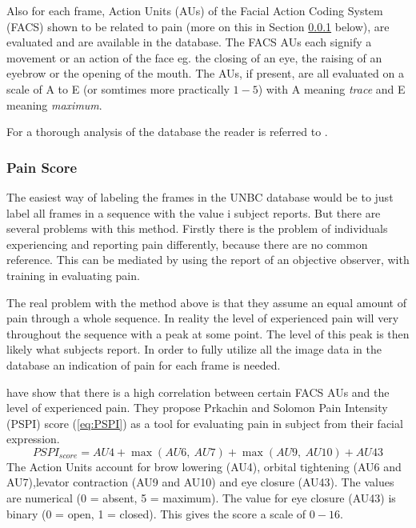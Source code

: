 \documentclass[Main]{subfiles}
\begin{document}
		Also for each frame, Action Units (AUs) of the Facial Action Coding System (FACS) \cite{Ekman1978} shown to be related to pain (more on this in Section \ref{ssub:pain_score} below), are evaluated and are available in the database. 
		The FACS AUs each signify a movement or an action of the face eg. the closing of an eye, the raising of an eyebrow or the opening of the mouth.
		The AUs, if present, are all evaluated on a scale of A to E (or somtimes more practically $1-5$) with A meaning \emph{trace} and E meaning \emph{maximum}.

		For a thorough analysis of the database the reader is referred to \cite{Lucey2012}.
		
		\subsubsection{Pain Score} %
			\label{ssub:pain_score}
			The easiest way of labeling the frames in the UNBC database would be to just label all frames in a sequence with the value i subject reports.
			But there are several problems with this method.
			Firstly there is the problem of individuals experiencing and reporting pain differently, because there are no common reference.
			This can be mediated by using the report of an objective observer, with training in evaluating pain.

			The real problem with the method above is that they assume an equal amount of pain through a whole sequence.
			In reality the level of experienced pain will very throughout the sequence with a peak at some point.
			The level of this peak is then likely what subjects report.
			In order to fully utilize all the image data in the database an indication of pain for each frame is needed.

			\citet{Prkachin1992} have show that there is a high correlation between certain FACS AUs and the level of experienced pain.
			They propose Prkachin and Solomon Pain Intensity (PSPI) score (\ref{eq:PSPI}) as a tool for evaluating pain in subject from their facial expression. 
			\begin{equation}
				\label{eq:PSPI} 
				PSPI_{score} = 
					AU4 + \max(AU6,\ AU7) + \max(AU9,\ AU10) + AU43
			\end{equation}
			The Action Units account for brow lowering (AU4), orbital tightening (AU6 and AU7),levator contraction (AU9 and AU10) and eye closure (AU43).
			The values are numerical (0 = absent, 5 = maximum).
			The value for eye closure (AU43) is binary (0 = open, 1 = closed).
			This gives the score a scale of $0-16$.
\end{document}
